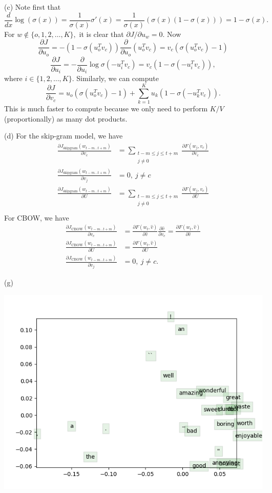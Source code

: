 \documentclass{article}
\newcommand{\pd}[2]{\frac{\partial #1}{\partial #2}}
\begin{document}
(c) Note first that
$$\frac{d}{dx} \log(\sigma(x)) = \frac{1}{\sigma(x)}\sigma'(x) = \frac{1}{\sigma(x)}\left(\sigma(x)(1 - \sigma(x))\right) = 1 - \sigma(x).$$
For $w \notin \{o, 1, 2, \dots, K\},$ it is clear that $\partial J/\partial u_w = 0$. Now
$$\pd{J}{u_o} = -(1 - \sigma(u_o^Tv_c))\pd{}{u_o}\left(u_o^Tv_c\right) = v_c(\sigma(u_o^Tv_c) - 1)$$
$$\pd{J}{u_i} = -\pd{}{u_i} \log\sigma(-u_i^Tv_c) = v_c(1 - \sigma(-u_i^Tv_c)),$$
where $i \in \{1, 2, \dots, K\}.$ Similarly, we can compute
$$\pd{J}{v_c} = u_o(\sigma(u_o^Tv_c) - 1) + \sum_{k=1}^K u_k(1 - \sigma(-u_k^Tv_c)).$$
This is much faster to compute because we only need to perform $K/V$ (proportionally) as many dot products.

(d) For the skip-gram model, we have
\begin{align*}
\pd{J_{\text{skipgram}}(w_{t-m \dots t+m})}{v_c} &= \sum_{\substack{t-m \le j \le t+m\\j \ne 0}} \pd{F(w_j, v_c)}{v_c}\\
\pd{J_{\text{skipgram}}(w_{t-m \dots t+m})}{v_j} &= 0, ~ j\ne c\\
\pd{J_{\text{skipgram}}(w_{t-m \dots t+m})}{U} &= \sum_{\substack{t-m \le j \le t+m\\j \ne 0}} \pd{F(w_j, v_c)}{U}\\
\end{align*}
For CBOW, we have
\begin{align*}
\pd{J_{\text{CBOW}}(w_{t-m \dots t+m})}{v_c} &= \pd{F(w_t, \hat{v})}{\hat{v}} \pd{\hat{v}}{v_c} = \pd{F(w_t, \hat{v})}{\hat{v}}\\
\pd{J_{\text{CBOW}}(w_{t-m \dots t+m})}{U} &= \pd{F(w_t, \hat{v})}{U}\\
\pd{J_{\text{CBOW}}(w_{t-m \dots t+m})}{v_j} &= 0, ~ j \ne c.
\end{align*}

(g)

\includegraphics{assignment1/q3_word_vectors.png}
\end{document}
